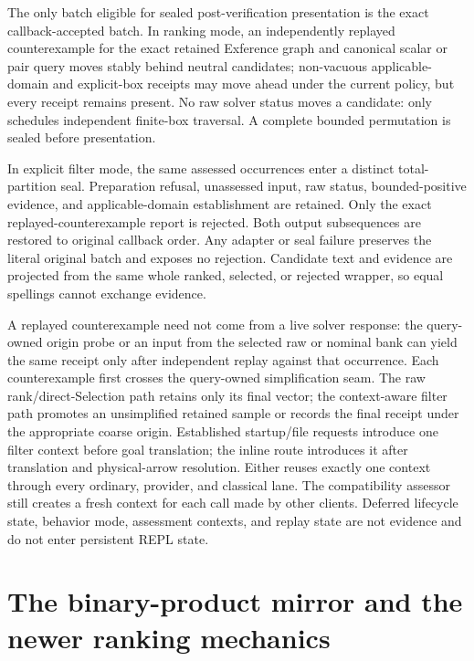 \documentclass[10pt,letterpaper,oneside]{report}
\newcommand{\code}[1]{\texttt{\detokenize{#1}}}
\begin{document}
\begin{invariantbox}[title={Current post-verification invariant}]
The only batch eligible for sealed post-verification presentation is the exact callback-accepted batch. In ranking mode, an independently replayed counterexample for the exact retained Exference graph and canonical scalar or pair query moves stably behind neutral candidates; non-vacuous applicable-domain and explicit-box receipts may move ahead under the current policy, but every receipt remains present. No raw solver status moves a candidate: \code{unsat} only schedules independent finite-box traversal. A complete bounded permutation is sealed before presentation.

In explicit filter mode, the same assessed occurrences enter a distinct total-partition seal. Preparation refusal, unassessed input, raw status, bounded-positive evidence, and applicable-domain establishment are retained. Only the exact replayed-counterexample report is rejected. Both output subsequences are restored to original callback order. Any adapter or seal failure preserves the literal original batch and exposes no rejection. Candidate text and evidence are projected from the same whole ranked, selected, or rejected wrapper, so equal spellings cannot exchange evidence.

A replayed counterexample need not come from a live solver response: the query-owned origin probe or an input from the selected raw or nominal bank can yield the same receipt only after independent replay against that occurrence. Each counterexample first crosses the query-owned simplification seam. The raw rank/direct-Selection path retains only its final vector; the context-aware filter path promotes an unsimplified retained sample or records the final receipt under the appropriate coarse origin. Established startup/file requests introduce one filter context before goal translation; the inline route introduces it after translation and physical-arrow resolution. Either reuses exactly one context through every ordinary, provider, and classical lane. The compatibility assessor still creates a fresh context for each call made by other clients. Deferred lifecycle state, behavior mode, assessment contexts, and replay state are not evidence and do not enter persistent REPL state.
\end{invariantbox}

\section*{The binary-product mirror and the newer ranking mechanics}
\end{document}
